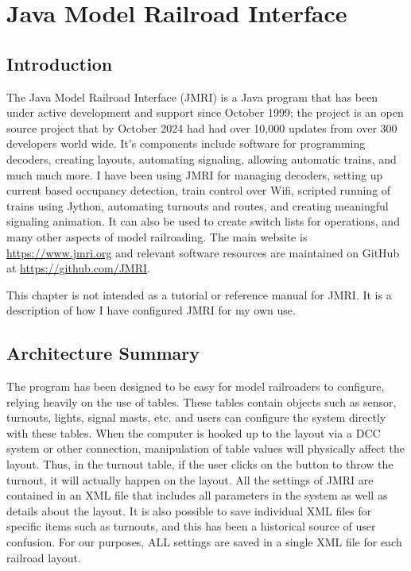 %



\chapter{Java Model Railroad Interface}
\minitoc
\section{Introduction}
The Java Model Railroad Interface (JMRI) is a Java program that has been under active development and support since October 1999;  the project
is an open source project that by October 2024 had had over 10,000 updates from over 300 developers world wide.  It's components include software 
for programming decoders, creating layouts, automating signaling, allowing automatic trains, and much much more.  I have been using JMRI for managing decoders,
setting up current based occupancy detection, train control over Wifi, scripted running of trains using Jython, automating turnouts and routes, and creating meaningful signaling animation.  It can also be used to create switch lists for operations, and many other aspects of model railroading.  The main website is \url{https://www.jmri.org} and relevant software resources are maintained on GitHub at \url{https://github.com/JMRI}.

This chapter is not intended as a tutorial or reference manual for JMRI.  It is a description of how I have configured JMRI for my own use.

\section{Architecture Summary}
The program has been designed to be easy for model railroaders to configure, relying heavily on the use of tables.  These tables contain objects such as 
sensor, turnouts, lights, signal masts, etc. and users can configure the system directly with these tables.  When the computer is hooked up to the layout via a DCC system or other connection, manipulation of table values will physically affect the layout.  Thus, in the turnout table, if the user clicks on the button to throw the turnout, it will actually happen on the layout.  All the settings of JMRI are contained in an XML file that includes all parameters in the system as well as details
about the layout.  It is also possible to save individual XML files for specific items such as turnouts, and this has been a historical source of user confusion.
For our purposes, ALL settings are saved in a single XML file for each railroad layout.

